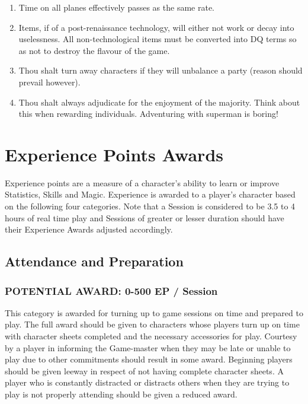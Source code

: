\documentclass{article}
\begin{document}
\begin{multicols}{2}
\begin{enumerate}
\item
Time on all planes effectively passes as the same rate.

\item
Items, if of a post-renaissance technology, will either not work or
decay into uselessness. All non-technological items must be converted
into DQ terms so as not to destroy the flavour of the game.

\item
Thou shalt turn away characters if they will unbalance a party (reason
should prevail however).

\item
Thou shalt always adjudicate for the enjoyment of the majority.  Think
about this when rewarding individuals.  Adventuring with superman is
boring!

\end{enumerate}

\newpage

\section{Experience Points Awards}


Experience points are a measure of a character's ability to learn or
improve Statistics, Skills and Magic.  Experience is awarded to a
player's character based on the following four categories. Note that a
Session is considered to be 3.5 to 4 hours of real time play and
Sessions of greater or lesser duration should have their Experience
Awards adjusted accordingly.

\subsection{Attendance and Preparation}

\subsubsection{POTENTIAL AWARD: 0-500 EP / Session}

This category is awarded for turning up to game sessions on time and
prepared to play.  The full award should be given to characters whose
players turn up on time with character sheets completed and the
necessary accessories for play.  Courtesy by a player in informing the
Game-master when they may be late or unable to play due to other
commitments should result in some award.  Beginning players should be
given leeway in respect of not having complete character sheets.  A
player who is constantly distracted or distracts others when they are
trying to play is not properly attending should be given a reduced
award.


\end{multicols}
\end{document}
